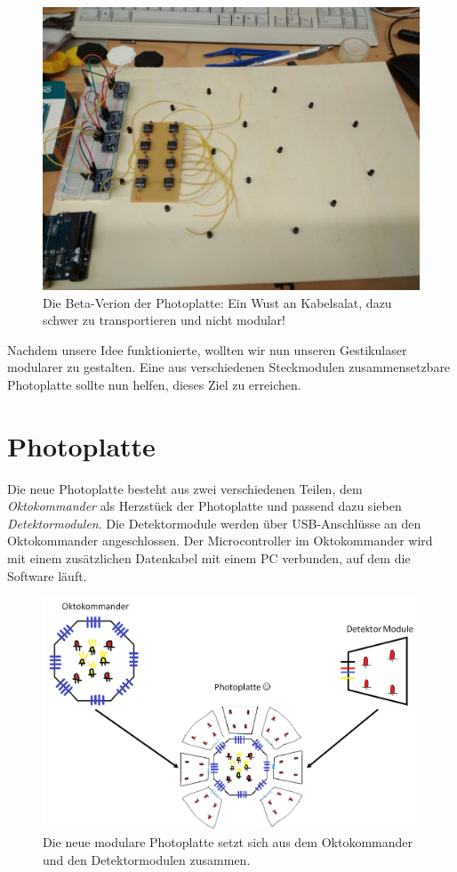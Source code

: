 \documentclass{sciposter}
\begin{document}
\begin{multicols}{3}
\begin{figure}[h]
	\centering
	\includegraphics[scale=0.35]{../figures/PhotoplatteBeta.jpeg}
	\caption{Die Beta-Verion der Photoplatte: Ein Wust an Kabelsalat, dazu schwer zu transportieren und nicht modular!}
	\label{fig:PhotoplatteBeta}
\end{figure}

Nachdem unsere Idee funktionierte, wollten wir nun unseren Gestikulaser modularer zu gestalten. Eine aus verschiedenen Steckmodulen zusammensetzbare Photoplatte sollte nun helfen, dieses Ziel zu erreichen.

\section{Photoplatte}
Die neue Photoplatte besteht aus zwei verschiedenen Teilen, dem \textit{Oktokommander} als Herzstück der Photoplatte und passend dazu sieben \textit{Detektormodulen}. Die Detektormodule werden über USB-Anschlüsse an den Oktokommander angeschlossen. Der Microcontroller im Oktokommander wird mit einem zusätzlichen Datenkabel mit einem PC verbunden, auf dem die Software läuft.

\begin{figure}[h]
	\centering
	\includegraphics[scale=0.8]{../figures/Photoplatte.png}
	\caption{Die neue modulare Photoplatte setzt sich aus dem Oktokommander und den Detektormodulen zusammen.}
	\label{fig:PhotoplatteAlpha}
\end{figure}


\end{multicols}
\end{document}
